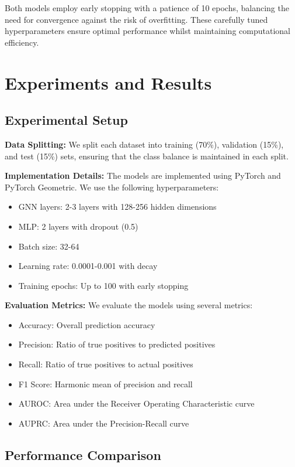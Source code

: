 \documentclass[12pt,a4paper]{article}
\begin{document}
Both models employ early stopping with a patience of 10 epochs, balancing the need for convergence against the risk of overfitting. These carefully tuned hyperparameters ensure optimal performance whilst maintaining computational efficiency.


\section{Experiments and Results}
\label{sec:experiments}

\subsection{Experimental Setup}
\label{sec:setup}

\textbf{Data Splitting:} We split each dataset into training (70\%), validation (15\%), and test (15\%) sets, ensuring that the class balance is maintained in each split.

\textbf{Implementation Details:} The models are implemented using PyTorch and PyTorch Geometric. We use the following hyperparameters:
\begin{itemize}
    \item GNN layers: 2-3 layers with 128-256 hidden dimensions
    \item MLP: 2 layers with dropout (0.5)
    \item Batch size: 32-64
    \item Learning rate: 0.0001-0.001 with decay
    \item Training epochs: Up to 100 with early stopping
\end{itemize}

\textbf{Evaluation Metrics:} We evaluate the models using several metrics:
\begin{itemize}
    \item Accuracy: Overall prediction accuracy
    \item Precision: Ratio of true positives to predicted positives
    \item Recall: Ratio of true positives to actual positives
    \item F1 Score: Harmonic mean of precision and recall
    \item AUROC: Area under the Receiver Operating Characteristic curve
    \item AUPRC: Area under the Precision-Recall curve
\end{itemize}

\subsection{Performance Comparison}
\label{sec:performance}
\end{document}
